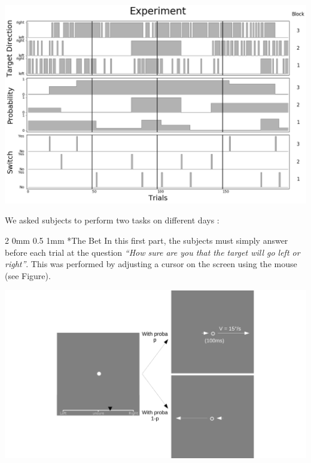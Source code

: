 \documentclass[profile,final,english, draft]{sciposter}%
\makeatletter
\renewcommand{\subsection}{\@startsection
        {subsection}%
        {2}%
        {0mm}%
        {0.5\baselineskip}%
        {1mm}%
        {\normalsize\color[rgb]{0.4,0,0}\bfseries}}%
\makeatother
\begin{document}
\begin{multicols}{3}
\begin{center} 
    \includegraphics[width=1\columnwidth]{exp}
\end{center}

We asked subjects to perform two tasks on different days :

\subsection*{The Bet}
In this first part, the subjects must simply answer before each trial at the question \textit{ ``How sure are you that the target will go left or right''}. This was performed by adjusting a cursor on the screen using the mouse (see Figure).
\begin{center} 
    \includegraphics[width=1\columnwidth]{materiel_bet}
\end{center}


\end{multicols}
\end{document}
